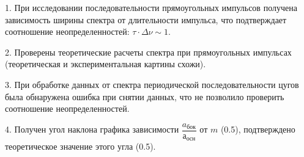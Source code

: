 \documentclass[a4paper,12pt]{article} %
\begin{document}
1. При исследовании последовательности прямоугольных импульсов получена зависимость ширины спектра от длительности импульса, что подтверждает соотношение неопределенностей: $\tau \cdot \Delta\nu \sim 1$.

2. Проверены теоретические расчеты спектра при прямоугольных импульсах (теоретическая и экспериментальная картины схожи).

3. При обработке данных от спектра периодической последовательности цугов была обнаружена ошибка при снятии данных, что не позволило проверить соотношение неопределенностей.

4. Получен угол наклона графика зависимости $\dfrac{a_{бок}}{а_{осн}}$ от $m$ (0.5), подтверждено теоретическое значение этого угла (0.5).
\end{document}

